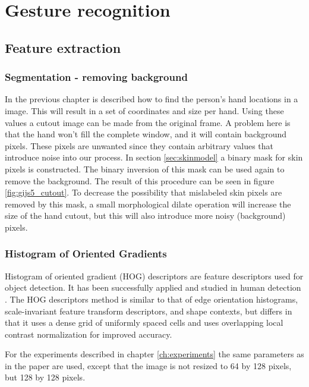 
\chapter{Gesture recognition}
\label{ch:gestures}



\section{Feature extraction}



\subsection*{Segmentation - removing background}
In the previous chapter is described how to find the person's hand locations in a image. This will result in a set of coordinates and size per hand. Using these values a cutout image can be made from the original frame. A problem here is that the hand won't fill the complete window, and it will contain background pixels. These pixels are unwanted since they contain arbitrary values that introduce noise into our process. In section \ref{sec:skinmodel} a binary mask for skin pixels is constructed. The binary inversion of this mask can be used again to remove the background. The result of this procedure can be seen in figure \ref{fig:gijs5_cutout}. To decrease the possibility that mislabeled skin pixels are removed by this mask, a small morphological dilate operation will increase the size of the hand cutout, but this will also introduce more noisy (background) pixels. 


\subsection*{Histogram of Oriented Gradients}
Histogram of oriented gradient (HOG) descriptors are feature descriptors used for object detection. It has been successfully applied and studied in human detection \cite{watanabe2009}.  The HOG descriptors method is similar to that of edge orientation histograms, scale-invariant feature transform descriptors, and shape contexts, but differs in that it uses a dense grid of uniformly spaced cells and uses overlapping local contrast normalization for improved accuracy.

For the experiments described in chapter \ref{ch:experiments} the same parameters as in the \cite{watanabe2009} paper are used, except that the image is not resized to 64 by 128 pixels, but 128 by 128 pixels.


